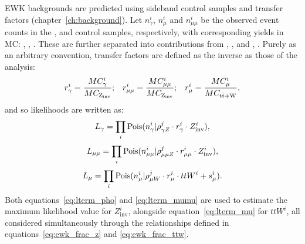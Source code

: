 EWK backgrounds are predicted using sideband control samples and transfer 
factors (chapter~\ref{ch:background}). Let $n_{\gamma}^i$, $n_{\mu}^i$ and
$n_{\mu\mu}^i$ be
the observed event counts in the \gj, \mj and \mmj control samples, 
respectively, with corresponding yields in MC: \mcp, \mcm, \mcmm. These are
further separated into contributions from \zinv, \mczinv, and ,
\mcttw. Purely as an arbitrary convention, transfer factors are defined as
the inverse as those of the analysis:
% 
\begin{equation}
r_{\gamma}^i = \frac{MC_{\gamma}^i}{MC_{\text{Z}_{\text{inv}}}};\;\;\;
r_{\mu\mu}^i = \frac{MC_{\mu\mu}^i}{MC_{\text{Z}_{\text{inv}}}};\;\;\;
r_{\mu}^i = \frac{MC_{\mu}^i}{MC_{\rm{t}\bar{\rm{t}}+\text{W}}},
\end{equation}
% 
and so likelihoods are written as:
% 
\begin{equation}
L_{\gamma} = \prod_i \text{Pois}(n_{\gamma}^i | \rho^j_{\gamma Z} \cdot r^i_{\gamma} \cdot Z^i_{\text{inv}}),
\label{eq:lterm_pho}
\end{equation}
\begin{equation}
L_{\mu\mu} = \prod_i \text{Pois}(n_{\mu\mu}^i | \rho^j_{\mu\mu Z} \cdot r^i_{\mu\mu} \cdot Z^i_{\text{inv}}),
\label{eq:lterm_mumu}
\end{equation}
\begin{equation}
L_{\mu} = \prod_i \text{Pois}(n_{\mu}^i | \rho^j_{\mu W} \cdot r^i_{\mu} \cdot ttW^i + s_{\mu}^i).
\label{eq:lterm_mu}
\end{equation}
% 
Both equations~\ref{eq:lterm_pho} and \ref{eq:lterm_mumu} are used to estimate the 
maximum likelihood value for $Z^i_{\text{inv}}$, alongside equation~\ref{eq:lterm_mu} 
for $ttW^i$, all considered simultaneously through the relationships defined in
equations~\ref{eq:ewk_frac_z} and \ref{eq:ewk_frac_ttw}.

